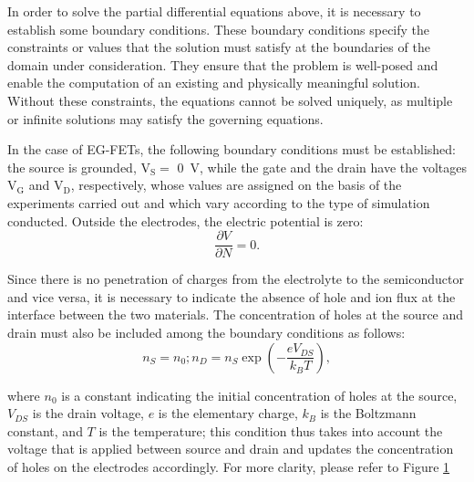 \begin{figure}[h]
\begin{minipage}{0.3\textwidth}
    \end{minipage}
    \caption{}
    \label{fig:boundaryConditions}
\end{figure}

In order to solve the partial differential equations above, it is necessary to establish some boundary conditions. These boundary conditions specify the constraints or values that the solution must satisfy at the boundaries of the domain under consideration. They ensure that the problem is well-posed and enable the computation of an existing and physically meaningful solution. Without these constraints, the equations cannot be solved uniquely, as multiple or infinite solutions may satisfy the governing equations.

In the case of EG-FETs, the following boundary conditions must be established: the source is grounded, \ie{} $\mathrm{V_S} =$ \SI{0}{V}, while the gate and the drain have the voltages $\mathrm{V_G}$ and $\mathrm{V_D}$, respectively, whose values are assigned on the basis of the experiments carried out and which vary according to the type of simulation conducted. Outside the electrodes, the electric potential is zero:
%
\begin{displaymath}
    \dfrac{\partial V}{\partial N} = 0.
\end{displaymath}

Since there is no penetration of charges from the electrolyte to the semiconductor and vice versa, it is necessary to indicate the absence of hole and ion flux at the interface between the two materials. The concentration of holes at the source and drain must also be included among the boundary conditions as follows:
%
\begin{equation}
    n_S = n_0; n_D = n_S \exp\left(-\dfrac{eV_{DS}}{k_BT}\right),
\end{equation}

where $n_0$ is a constant indicating the initial concentration of holes at the source, $V_{DS}$ is the drain voltage, $e$ is the elementary charge, $k_B$ is the Boltzmann constant, and $T$ is the temperature; this condition thus takes into account the voltage that is applied between source and drain and updates the concentration of holes on the electrodes accordingly. For more clarity, please refer to Figure \ref{fig:boundaryConditions}

